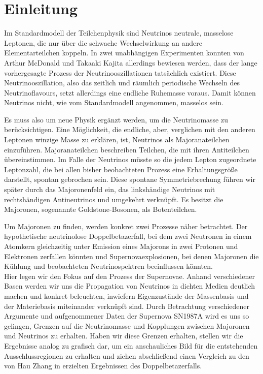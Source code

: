 \chapter{Einleitung}
\label{chap:einleitung}

Im Standardmodell der Teilchenphysik sind Neutrinos neutrale, masselose Leptonen, die nur über die schwache Wechselwirkung an andere Elementarteilchen koppeln.
In zwei unabhängigen Experimenten konnten von Arthur McDonald und Takaaki Kajita allerdings bewiesen werden, dass der lange vorhergesagte Prozess der Neutrinooszillationen tatsächlich existiert.
Diese Neutrinooszillation, also das zeitlich und räumlich periodische Wechseln des Neutrinoflavours, setzt allerdings eine endliche Ruhemasse voraus.
Damit können Neutrinos nicht, wie vom Standardmodell angenommen, masselos sein.

Es muss also um neue Physik ergänzt werden, um die Neutrinomasse zu berücksichtigen.
Eine Möglichkeit, die endliche, aber, verglichen mit den anderen Leptonen winzige Masse zu erklären, ist, Neutrinos als Majoranateilchen einzuführen.
Majoranateilchen beschreiben Teilchen, die mit ihren Antiteilchen übereinstimmen.
Im Falle der Neutrinos müsste so die jedem Lepton zugeordnete Leptonzahl, die bei allen bisher beobachteten Prozess eine Erhaltungsgröße darstellt, spontan gebrochen sein.
Diese spontane Symmetriebrechung führen wir später durch das Majoronenfeld ein, das linkshändige Neutrinos mit rechtshändigen Antineutrinos und umgekehrt verknüpft.
Es besitzt die Majoronen, sogenannte Goldstone-Bosonen, als Botenteilchen.

Um Majoronen zu finden, werden konkret zwei Prozesse näher betrachtet.
Der hypothetische neutrinolose Doppelbetazerfall, bei dem zwei Neutronen in einem Atomkern gleichzeitig unter Emission eines Majorons in zwei Protonen und Elektronen zerfallen könnten und Supernovaexplosionen, bei denen
Majoronen die Kühlung und beobachteten Neutrinospektren beeinflussen könnten. \\
Hier legen wir den Fokus auf den Prozess der Supernovae.
Anhand verschiedener Basen werden wir uns die Propagation von Neutrinos in dichten Medien deutlich machen und konkret beleuchten, 
inwiefern Eigenzustände der Massenbasis und der Materiebasis miteinander verknüpft sind.
Durch Betrachtung verschiedener Argumente und aufgenommener Daten der Supernova SN1987A wird es uns so gelingen, Grenzen auf die Neutrinomasse und Kopplungen zwischen Majoronen und Neutrinos zu erhalten.
Haben wir diese Grenzen erhalten, stellen wir die Ergebnisse analog zu \cite{päspaper} grafisch dar, um ein anschauliches Bild für die entstehenden Ausschlussregionen zu erhalten und ziehen abschließend einen Vergleich
zu den von Hau Zhang in \cite{hauhau} erzielten Ergebnissen des Doppelbetazerfalls.


